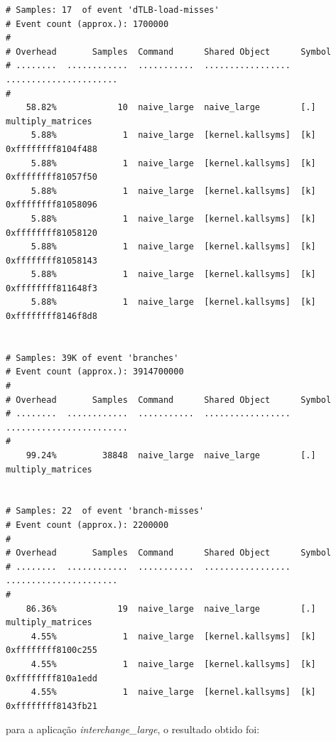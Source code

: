 \documentclass[conference,compsoc]{IEEEtran}
\begin{document}
\begin{lstlisting}
# Samples: 17  of event 'dTLB-load-misses'
# Event count (approx.): 1700000
#
# Overhead       Samples  Command      Shared Object      Symbol                
# ........  ............  ...........  .................  ......................
#
    58.82%            10  naive_large  naive_large        [.] multiply_matrices 
     5.88%             1  naive_large  [kernel.kallsyms]  [k] 0xffffffff8104f488
     5.88%             1  naive_large  [kernel.kallsyms]  [k] 0xffffffff81057f50
     5.88%             1  naive_large  [kernel.kallsyms]  [k] 0xffffffff81058096
     5.88%             1  naive_large  [kernel.kallsyms]  [k] 0xffffffff81058120
     5.88%             1  naive_large  [kernel.kallsyms]  [k] 0xffffffff81058143
     5.88%             1  naive_large  [kernel.kallsyms]  [k] 0xffffffff811648f3
     5.88%             1  naive_large  [kernel.kallsyms]  [k] 0xffffffff8146f8d8


# Samples: 39K of event 'branches'
# Event count (approx.): 3914700000
#
# Overhead       Samples  Command      Shared Object      Symbol                  
# ........  ............  ...........  .................  ........................
#
    99.24%         38848  naive_large  naive_large        [.] multiply_matrices   


# Samples: 22  of event 'branch-misses'
# Event count (approx.): 2200000
#
# Overhead       Samples  Command      Shared Object      Symbol                
# ........  ............  ...........  .................  ......................
#
    86.36%            19  naive_large  naive_large        [.] multiply_matrices 
     4.55%             1  naive_large  [kernel.kallsyms]  [k] 0xffffffff8100c255
     4.55%             1  naive_large  [kernel.kallsyms]  [k] 0xffffffff810a1edd
     4.55%             1  naive_large  [kernel.kallsyms]  [k] 0xffffffff8143fb21
\end{lstlisting}

para a aplicação \textit{interchange\_large}, o resultado obtido foi:
\end{document}
